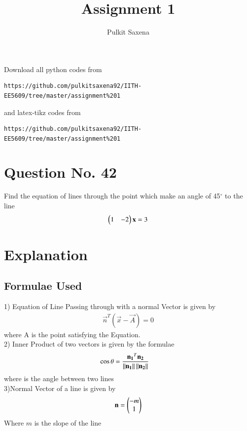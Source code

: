 \documentclass[journal,12pt,twocolumn]{IEEEtran}
\begin{document}
     \def\rightbox#1{\makebox[0in][r]{#1}}
     \def\centbox#1{\makebox[0in]{#1}}
     \def\topbox#1{\raisebox{-\baselineskip}[0in][0in]{#1}}
     \def\midbox#1{\raisebox{-0.5\baselineskip}[0in][0in]{#1}}
\vspace{3cm}
\title{Assignment 1}
\author{Pulkit Saxena}
\maketitle
\newpage
\bigskip
\renewcommand{\thefigure}{\theenumi}
\renewcommand{\thetable}{\theenumi}
%
Download all python codes from 
\begin{lstlisting}
https://github.com/pulkitsaxena92/IITH-EE5609/tree/master/assignment%201
\end{lstlisting}
%
and latex-tikz codes from 
%
\begin{lstlisting}
https://github.com/pulkitsaxena92/IITH-EE5609/tree/master/assignment%201
\end{lstlisting}
\section{Question No. 42}
Find the equation of lines through the point   which make an angle of 45$^{\circ}$ to the line
\begin{align}
\begin{pmatrix}1 & -2\end{pmatrix}\mathbf{x} = 3 
\end{align}
\section{Explanation}
\subsection{Formulae Used}
1) Equation of Line Passing through  with a normal Vector is given by
\begin{align}
\vec{n}^T(\vec{x}-\vec{A})=0 
\end{align}
where A is the point satisfying the Equation.
\\2) Inner Product of two vectors is given by the formulae
\begin{align}
 \cos \theta &= \frac{\mathbf{n_1}^T\mathbf{n_2}}{\left\lVert\mathbf{n_1}\right\rVert\left\lVert\mathbf{n_2}\right\rVert}  
\end{align}
where is the angle between two lines
\\3)Normal Vector of a line is given by
\begin{align}
\Vec{n}=\myvec{-m\\1}
\end{align}
Where $m$ is the slope of the line
\end{document}
